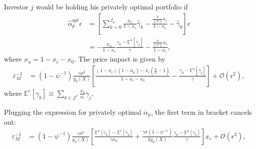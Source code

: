 Investor $j$ would be holding his privately optimal portfolio if
\begin{align}
    \hat{\alpha}_p^{opt} \epsilon &= \left[\sum_{k=0}^{J_u} \frac{x_k}{1-x_c} \hat{\gamma}_k -\frac{\frac{\hat{\sigma}}{\|\sigma\|} x_c }{1-x_c}- \hat{\gamma}_0\right] \epsilon\\
     &= -\frac{x_u}{1-x_c}\frac{\gamma_0-\mathbb{E}^u[\gamma_j] }{\gamma} - \frac{\frac{\hat{\sigma}}{\|\sigma\|} x_c }{1-x_c},
\end{align}
where $x_u=1-x_c - x_0.$
The price impact is given by
\begin{align}		
		\varepsilon_M^{-1}&=
		\left(1-\psi^{-1}\right) \frac{\gamma \sigma^{2}}{y_{0}(X)}\left[\frac{(1-x_c)(1-\overline{\alpha}_{p})-x_c(\frac{\overline{\sigma}}{\sigma}-1)}{1-x_c -x_0}-\frac{\gamma_{0}-\mathbb{E}^{u}[\gamma_{j}]}{\gamma}\right]%
  +\mathcal{O}\left(\epsilon^{2}\right),		
		\end{align}						
	where $ \mathbb{E}^c[\gamma_k] \equiv\sum_{k\in\mathcal{J}^c} \frac{x_k}{x_c} \gamma_j. $

Plugging the expression for privately optimal $\overline{\alpha}_p$, the first term in bracket cancels out:
\begin{align}		
    \varepsilon_M^{-1}&= \left(1-\psi^{-1}\right) \frac{\gamma \sigma^{2}}{y_{0}(X)}\left[\frac{\mathbb{E}^{u}[\gamma_{k}]-\mathbb{E}^{c}[\gamma_{k}]}{\gamma x_{u}}+\frac{\gamma \sigma\left(1-\psi^{-1}\right)}{2 y_{0}(X)} \frac{\gamma_{0}-\mathbb{E}^{u}[\gamma_{k}]}{\gamma}\right] x_{c}+\mathcal{O}\left(\epsilon^{2}\right),	
\end{align}			


